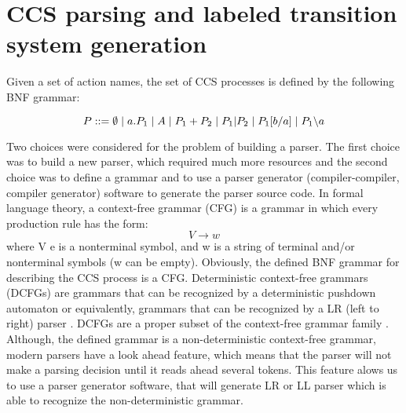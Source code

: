 \section{CCS parsing and labeled transition system generation}
\label{sec:parsing}

Given a set of action names, the set of CCS processes is defined by the following BNF grammar:

\begin{equation}\label{eq:ccs_bnf}
P ::= \emptyset \hspace{1 mm} | \hspace{1 mm} a.P_{1} \hspace{1 mm} | \hspace{1 mm} A \hspace{1 mm} | \hspace{1 mm}P_{1}+P_{2} \hspace{1 mm} |
\hspace{1 mm} P_{1} | P_{2} \hspace{1 mm} | \hspace{1 mm} P_{1}[b/a] \hspace{1 mm} | \hspace{1 mm} P_{1} \backslash a
\end{equation}

Two choices were considered for the problem of building a parser. The first choice was to build
a new parser, which required much more resources and the second choice was to define a grammar
and to use a parser generator (compiler-compiler, compiler generator) software to generate the parser source code.
In formal language theory, a context-free grammar (CFG) is a grammar in which every production 
rule has the form:
\[V \rightarrow w \]
where V e is a nonterminal symbol, and w is a string of terminal and/or nonterminal symbols 
(w can be empty). Obviously, the defined BNF grammar for describing the CCS process is a CFG. 
Deterministic context-free grammars (DCFGs) are grammars that can be recognized by a 
deterministic pushdown automaton or equivalently, grammars that can be recognized by a LR (left to right) parser \cite{Chomsky}\cite{Compilers}. 
DCFGs are a proper subset of the context-free grammar family \cite{Chomsky}. Although, the defined grammar is 
a non-deterministic context-free grammar, modern parsers have a look ahead feature, which means that
the parser will not make a parsing decision until it reads ahead several tokens. This feature
alows us to use a parser generator software, that will generate LR or LL parser which is able to
recognize the non-deterministic grammar.


